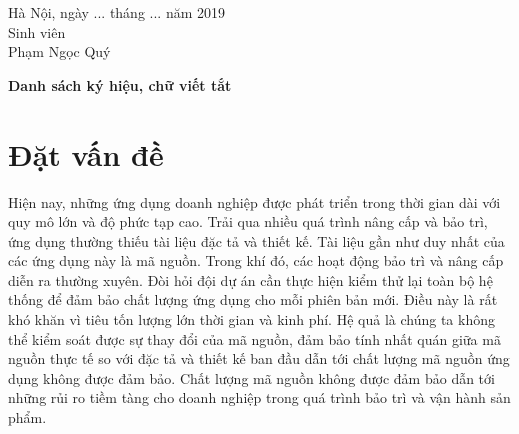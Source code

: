 \documentclass[12pt]{report}
\begin{document}
\begin{flushright}
	\begin{varwidth}{\linewidth}\centering
		Hà Nội, ngày ... tháng ... năm 2019\\
		Sinh viên\\[2cm]
		Phạm Ngọc Quý
	\end{varwidth}
\end{flushright}

\newpage
\tableofcontents

\newpage
{}
\listoftables

\newpage
{}
\begin{flushleft}
\bfseries{\Huge{Danh sách ký hiệu, chữ viết tắt}}
\end{flushleft}
\begin{table}[h]
	\centering
\end{table}

\newpage
{}
\listoffigures

\newpage
{}
\setcounter{page}{1}
\chapter{Đặt vấn đề}
\label{chap:intro}
Hiện nay, những ứng dụng doanh nghiệp được phát triển trong thời gian dài với quy mô lớn và độ phức tạp cao. Trải qua nhiều quá trình nâng cấp và bảo trì, ứng dụng thường thiếu tài liệu đặc tả và thiết kế. Tài liệu gần như duy nhất của các ứng dụng này là mã nguồn.
Trong khí đó, các hoạt động bảo trì và nâng cấp diễn ra thường xuyên. Đòi hỏi đội dự án cần thực hiện kiểm thử lại toàn bộ hệ thống để đảm bảo chất lượng ứng dụng cho mỗi phiên bản mới. Điều này là rất khó khăn vì tiêu tốn lượng lớn thời gian và kinh phí. Hệ quả là chúng ta không thể kiểm soát được sự thay đổi của mã nguồn, đảm bảo tính nhất quán giữa mã nguồn thực tế so với đặc tả và thiết kế ban đầu dẫn tới chất lượng mã nguồn ứng dụng không được đảm bảo. Chất lượng mã nguồn không được đảm bảo dẫn tới những rủi ro tiềm tàng cho doanh nghiệp trong quá trình bảo trì và vận hành sản phẩm.
\end{document}

